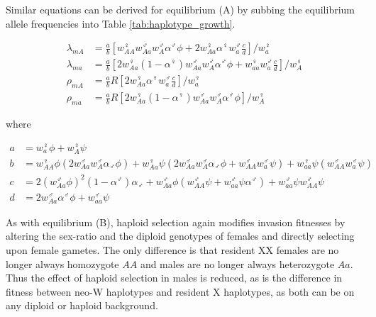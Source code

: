 \documentclass[12pt]{article}
\begin{document}

Similar equations can be derived for equilibrium (A) by subbing the equilibrium allele frequencies into Table \ref{tab:haplotype_growth}.

\begin{subequations}\label{Ainvasion}
\begin{align}
\lambda_{mA}&= \frac{a}{b} \left[w_{AA}^\female w_{Aa}^\male w_A^\male \alpha^\male \phi + 2 w_{Aa}^\female \alpha^\female w_a^\male \frac{c}{d}\right] / w_a^\female \\
\lambda_{ma}&= \frac{a}{b} \left[2 w_{Aa}^\female (1-\alpha^\female) w_{Aa}^\male w_A^\male \alpha^\male \phi+  w_{aa}^\female w_a^\male \frac{c}{d}\right] / w_A^\female \\
\rho_{mA}&= \frac{a}{b} R \left[ 2 w_{Aa}^\female \alpha^\female w_a^\male \frac{c}{d} \right] / w_a^\female\\ 
\rho_{ma}&= \frac{a}{b} R \left[ 2 w_{Aa}^\female (1-\alpha^\female) w_{Aa}^\male w_A^\male \alpha^\male \phi \right] / w_A^\female
\end{align}
\end{subequations}

\noindent
where 

\begin{subequations}
\begin{align}
a &= w_a^\female \phi + w_A^\female \psi \\
b &= w_{AA}^\female \phi (2 w_{Aa}^\male w_A^\male \alpha_\male \phi) + w_{Aa}^\female \psi (2 w_{Aa}^\male w_A^\male \alpha_\male \phi + w_{AA}^\male w_a^\male \psi) + w_{aa}^\female \psi(w_{AA}^\male w_a^\male \psi) \\
c &= 2(w_{Aa}^\male\phi)^2(1-\alpha^\male)\alpha_\male + w_{Aa}^\male\phi(w_{AA}^\male \psi + w_{aa}^\male \psi \alpha^\male) + w_{aa}^\male \psi w_{AA}^\male \psi \\
d &= 2 w_{Aa}^\male \alpha^\male \phi + w_{aa}^\male \psi
\end{align}
\end{subequations}

As with equilibrium (B), haploid selection again modifies invasion fitnesses by altering the sex-ratio and the diploid genotypes of females and directly selecting upon female gametes.
The only difference is that resident XX females are no longer always homozygote $AA$ and males are no longer always heterozygote $Aa$.
Thus the effect of haploid selection in males is reduced, as is the difference in fitness between neo-W haplotypes and resident X haplotypes, as both can be on any diploid or haploid background.  
\end{document}
